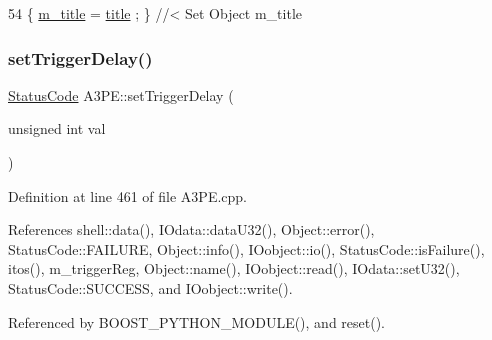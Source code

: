 \begin{DoxyCode}
54 \{ \hyperlink{classObject_affbeea1953eb5163573b92fad8f75727}{m\_title} = \hyperlink{classObject_a73a0f1a41828fdd8303dd662446fb6c3}{title} ; \} \textcolor{comment}{//< Set Object m\_title}
\end{DoxyCode}
\mbox{\label{classA3PE_a6a63fc9503e0aa89ee9928fc7222ce0f}} 
\subsubsection{\texorpdfstring{set\+Trigger\+Delay()}{setTriggerDelay()}}
{\footnotesize\ttfamily \hyperlink{classStatusCode}{Status\+Code} A3\+P\+E\+::set\+Trigger\+Delay (\begin{DoxyParamCaption}\item[{unsigned int}]{val }\end{DoxyParamCaption})}



Definition at line 461 of file A3\+P\+E.\+cpp.



References shell\+::data(), I\+Odata\+::data\+U32(), Object\+::error(), Status\+Code\+::\+F\+A\+I\+L\+U\+RE, Object\+::info(), I\+Oobject\+::io(), Status\+Code\+::is\+Failure(), itos(), m\+\_\+trigger\+Reg, Object\+::name(), I\+Oobject\+::read(), I\+Odata\+::set\+U32(), Status\+Code\+::\+S\+U\+C\+C\+E\+SS, and I\+Oobject\+::write().



Referenced by B\+O\+O\+S\+T\+\_\+\+P\+Y\+T\+H\+O\+N\+\_\+\+M\+O\+D\+U\+L\+E(), and reset().



